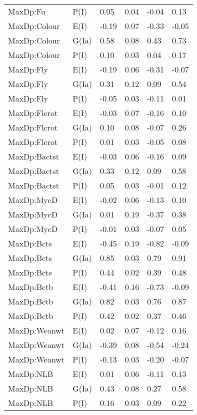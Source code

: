 \begin{center}
\begin{longtable}{|p{1.1in}|p{0.7in}|p{0.7in}|p{0.6in}|p{0.6in}|p{0.6in}|}
  MaxDp:Fu & P(I) & 0.05 & 0.04 & -0.04 & 0.13 \\ 
  MaxDp:Colour & E(I) & -0.19 & 0.07 & -0.33 & -0.05 \\ 
  MaxDp:Colour & G(Ia) & 0.58 & 0.08 & 0.43 & 0.73 \\ 
  MaxDp:Colour & P(I) & 0.10 & 0.03 & 0.04 & 0.17 \\ 
  MaxDp:Fly & E(I) & -0.19 & 0.06 & -0.31 & -0.07 \\ 
  MaxDp:Fly & G(Ia) & 0.31 & 0.12 & 0.09 & 0.54 \\ 
  MaxDp:Fly & P(I) & -0.05 & 0.03 & -0.11 & 0.01 \\ 
  MaxDp:Flcrot & E(I) & -0.03 & 0.07 & -0.16 & 0.10 \\ 
  MaxDp:Flcrot & G(Ia) & 0.10 & 0.08 & -0.07 & 0.26 \\ 
  MaxDp:Flcrot & P(I) & 0.01 & 0.03 & -0.05 & 0.08 \\ 
  MaxDp:Bactst & E(I) & -0.03 & 0.06 & -0.16 & 0.09 \\ 
  MaxDp:Bactst & G(Ia) & 0.33 & 0.12 & 0.09 & 0.58 \\ 
  MaxDp:Bactst & P(I) & 0.05 & 0.03 & -0.01 & 0.12 \\ 
  MaxDp:MycD & E(I) & -0.02 & 0.06 & -0.13 & 0.10 \\ 
  MaxDp:MycD & G(Ia) & 0.01 & 0.19 & -0.37 & 0.38 \\ 
  MaxDp:MycD & P(I) & -0.01 & 0.03 & -0.07 & 0.05 \\ 
  MaxDp:Bcts & E(I) & -0.45 & 0.19 & -0.82 & -0.09 \\ 
  MaxDp:Bcts & G(Ia) & 0.85 & 0.03 & 0.79 & 0.91 \\ 
  MaxDp:Bcts & P(I) & 0.44 & 0.02 & 0.39 & 0.48 \\ 
  MaxDp:Bctb & E(I) & -0.41 & 0.16 & -0.73 & -0.09 \\ 
  MaxDp:Bctb & G(Ia) & 0.82 & 0.03 & 0.76 & 0.87 \\ 
  MaxDp:Bctb & P(I) & 0.42 & 0.02 & 0.37 & 0.46 \\ 
  MaxDp:Weanwt & E(I) & 0.02 & 0.07 & -0.12 & 0.16 \\ 
  MaxDp:Weanwt & G(Ia) & -0.39 & 0.08 & -0.54 & -0.24 \\ 
  MaxDp:Weanwt & P(I) & -0.13 & 0.03 & -0.20 & -0.07 \\ 
  MaxDp:NLB & E(I) & 0.01 & 0.06 & -0.11 & 0.13 \\ 
  MaxDp:NLB & G(Ia) & 0.43 & 0.08 & 0.27 & 0.58 \\ 
  MaxDp:NLB & P(I) & 0.16 & 0.03 & 0.09 & 0.22 \\ 

\end{longtable}
\end{center}
